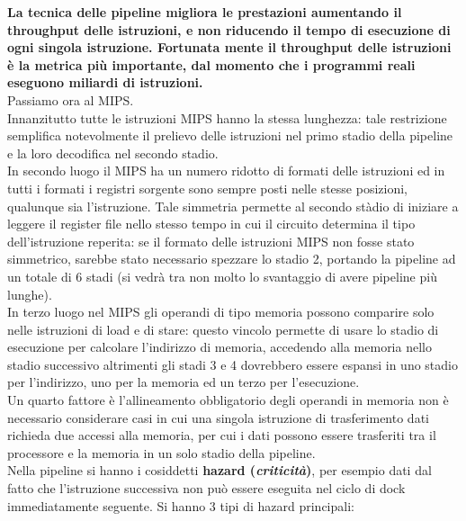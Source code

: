 \documentclass[a4paper,12pt, oneside]{book}
\begin{document}
\textbf{La tecnica delle pipeline migliora le prestazioni aumentando il throughput delle istruzioni, e non riducendo il tempo di esecuzione di ogni singola istruzione. Fortunata mente il throughput delle istruzioni è la metrica più importante, dal momento che i programmi reali eseguono miliardi di istruzioni.}\\
Passiamo ora al MIPS.\\
Innanzitutto tutte le istruzioni MIPS hanno la stessa lunghezza: tale restrizione
semplifica notevolmente il prelievo delle istruzioni nel primo stadio della pipeline
e la loro decodifica nel secondo stadio. \\
In secondo luogo il MIPS ha un numero ridotto di formati delle istruzioni ed in
tutti i formati i registri sorgente sono sempre posti nelle stesse posizioni, qualunque sia l'istruzione. Tale simmetria permette al secondo stàdio di iniziare a leggere
il register file nello stesso tempo in cui il circuito determina il tipo dell'istruzione
reperita: se il formato delle istruzioni MIPS non fosse stato simmetrico, sarebbe
stato necessario spezzare lo stadio 2, portando la pipeline ad un totale di 6 stadi (si
vedrà tra non molto lo svantaggio di avere pipeline più lunghe).\\
In terzo luogo nel MIPS gli operandi di tipo memoria possono comparire solo
nelle istruzioni di load e di stare: questo vincolo permette di usare lo stadio di esecuzione per calcolare l'indirizzo di memoria, accedendo alla memoria nello stadio successivo altrimenti gli stadi 3 e 4 dovrebbero essere espansi in uno stadio per l'indirizzo, uno per la memoria ed un terzo per l'esecuzione.\\
Un quarto fattore è l'allineamento obbligatorio degli operandi in memoria non è necessario considerare casi in cui una singola istruzione di trasferimento dati richieda due
accessi alla memoria, per cui i dati possono essere trasferiti tra il processore e la
memoria in un solo stadio della pipeline.\\
Nella pipeline si hanno i cosiddetti \textbf{hazard (\textit{criticità})}, per esempio dati dal fatto che l'istruzione successiva non può essere eseguita nel ciclo di dock immediatamente seguente. Si hanno 3 tipi di hazard principali:
\end{document}
